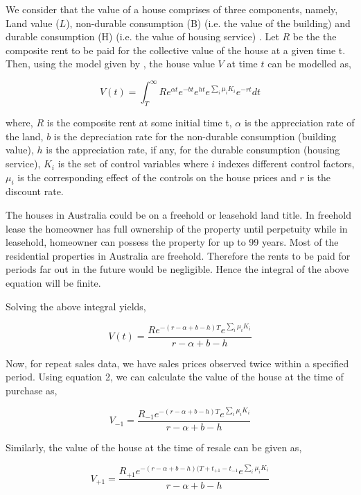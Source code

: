 \documentclass{article}
\begin{document}
We consider that the value of a house comprises of three components, namely, Land value ($L$), non-durable consumption (B) (i.e. the value of the building) and durable consumption (H) (i.e. the value of housing service) \citep{flavin2008model}. Let $R$ be the the composite rent to be paid for the collective value of the house at a given time t. Then, using the model given by \citet{kiel1995effect}, the house value $V$ at time $t$ can be modelled as,

\begin{equation}
    V(t) = \int_{T}^{\infty} R e^{\alpha t} e^{-bt} e^{ht} e^{\sum_{i} \mu_i K_i} e^{-rt} dt
\end{equation}

where, $R$ is the composite rent at some initial time t, $\alpha$ is the appreciation rate of the land, $b$ is the depreciation rate for the non-durable consumption (building value), $h$ is the appreciation rate, if any, for the durable consumption (housing service), $K_i$ is the set of control variables where $i$ indexes different control factors, $\mu_i$ is the corresponding effect of the controls on the house prices and $r$ is the discount rate. 

The houses in Australia could be on a freehold or leasehold land title. In freehold lease the homeowner has full ownership of the property until perpetuity while in leasehold, homeowner can possess the property for up to 99 years. Most of the residential properties in Australia are freehold. Therefore the rents to be paid for periods far out in the future would be negligible. Hence the integral of the above equation will be finite. 

Solving the above integral yields,

\begin{equation}
    V(t) = \frac{R e^{-(r-\alpha+b-h)T} e^{\sum_{i} \mu_i K_i}}{r-\alpha+b-h}
\end{equation}

Now, for repeat sales data, we have sales prices observed twice within a specified period. Using equation 2, we can calculate the value of the house at the time of purchase as,

\begin{equation}
    V_{-1} = \frac{R_{-1} e^{-(r-\alpha+b-h)T} e^{\sum_{i} \mu_i K_i}}{r-\alpha+b-h}
\end{equation}

Similarly, the value of the house at the time of resale can be given as,

\begin{equation}
    V_{+1} = \frac{R_{+1} e^{-(r-\alpha+b-h)(T+t_{+1}-t_{-1}} e^{\sum_{i} \mu_i K_i}}{r-\alpha+b-h}
\end{equation}
\end{document}
